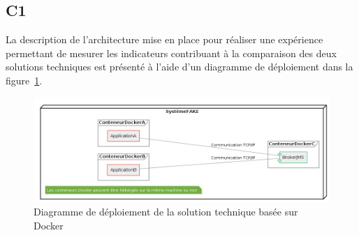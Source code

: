 \subsection{C1}
    La description de l'architecture mise en place pour réaliser une expérience permettant de mesurer les indicateurs contribuant à la comparaison des deux solutions techniques est présenté à l'aide d'un diagramme de déploiement dans la figure~\ref{fig:deploiement-docker}.

    \begin{figure}[H]
        \centering
        \includegraphics[width=\textwidth]{images/C1.png}
        \caption{Diagramme de déploiement de la solution technique basée sur Docker}
        \label{fig:deploiement-docker}
    \end{figure}

